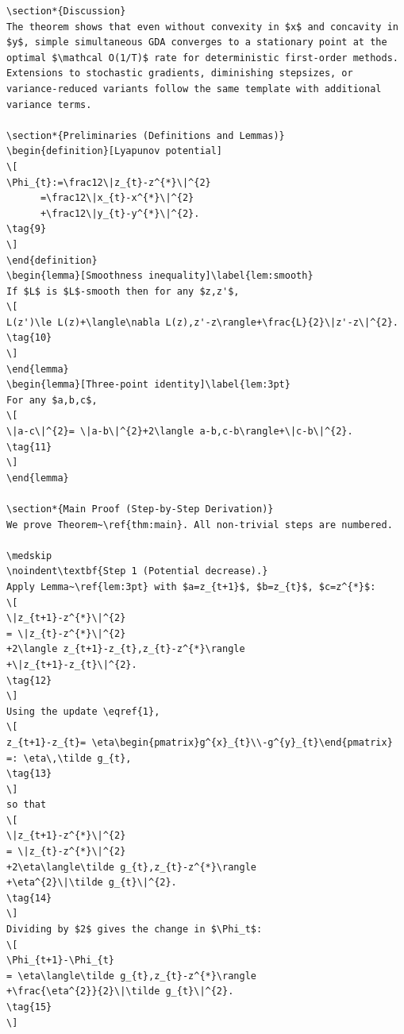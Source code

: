 {{\begin{verbatim}
\section*{Discussion}
The theorem shows that even without convexity in $x$ and concavity in $y$, simple simultaneous GDA converges to a stationary point at the optimal $\mathcal O(1/T)$ rate for deterministic first‑order methods. Extensions to stochastic gradients, diminishing stepsizes, or variance‑reduced variants follow the same template with additional variance terms.

\section*{Preliminaries (Definitions and Lemmas)}
\begin{definition}[Lyapunov potential]
\[
\Phi_{t}:=\frac12\|z_{t}-z^{*}\|^{2}
      =\frac12\|x_{t}-x^{*}\|^{2}
      +\frac12\|y_{t}-y^{*}\|^{2}.
\tag{9}
\]
\end{definition}
\begin{lemma}[Smoothness inequality]\label{lem:smooth}
If $L$ is $L$‑smooth then for any $z,z'$,
\[
L(z')\le L(z)+\langle\nabla L(z),z'-z\rangle+\frac{L}{2}\|z'-z\|^{2}.
\tag{10}
\]
\end{lemma}
\begin{lemma}[Three‑point identity]\label{lem:3pt}
For any $a,b,c$,
\[
\|a-c\|^{2}= \|a-b\|^{2}+2\langle a-b,c-b\rangle+\|c-b\|^{2}.
\tag{11}
\]
\end{lemma}

\section*{Main Proof (Step‑by‑Step Derivation)}
We prove Theorem~\ref{thm:main}. All non‑trivial steps are numbered.

\medskip
\noindent\textbf{Step 1 (Potential decrease).}  
Apply Lemma~\ref{lem:3pt} with $a=z_{t+1}$, $b=z_{t}$, $c=z^{*}$:
\[
\|z_{t+1}-z^{*}\|^{2}
= \|z_{t}-z^{*}\|^{2}
+2\langle z_{t+1}-z_{t},z_{t}-z^{*}\rangle
+\|z_{t+1}-z_{t}\|^{2}.
\tag{12}
\]
Using the update \eqref{1},
\[
z_{t+1}-z_{t}= \eta\begin{pmatrix}g^{x}_{t}\\-g^{y}_{t}\end{pmatrix}
=: \eta\,\tilde g_{t},
\tag{13}
\]
so that
\[
\|z_{t+1}-z^{*}\|^{2}
= \|z_{t}-z^{*}\|^{2}
+2\eta\langle\tilde g_{t},z_{t}-z^{*}\rangle
+\eta^{2}\|\tilde g_{t}\|^{2}.
\tag{14}
\]
Dividing by $2$ gives the change in $\Phi_t$:
\[
\Phi_{t+1}-\Phi_{t}
= \eta\langle\tilde g_{t},z_{t}-z^{*}\rangle
+\frac{\eta^{2}}{2}\|\tilde g_{t}\|^{2}.
\tag{15}
\]


\end{verbatim}}}

